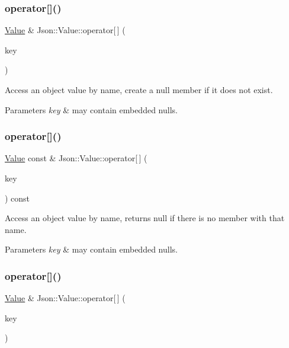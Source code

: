 \subsubsection{\texorpdfstring{operator[]()}{operator[]()}\hspace{0.1cm}{\footnotesize\ttfamily [7/9]}}
{\footnotesize\ttfamily \hyperlink{classJson_1_1Value}{Value} \& Json\+::\+Value\+::operator\mbox{[}$\,$\mbox{]} (\begin{DoxyParamCaption}\item[{const J\+S\+O\+N\+C\+P\+P\+\_\+\+S\+T\+R\+I\+NG \&}]{key }\end{DoxyParamCaption})}

Access an object value by name, create a null member if it does not exist. 
\begin{DoxyParams}{Parameters}
{\em key} & may contain embedded nulls. \\
\hline
\end{DoxyParams}
\mbox{\label{classJson_1_1Value_aba60f69dcd85e935aa85e7a517e03427}} 
\subsubsection{\texorpdfstring{operator[]()}{operator[]()}\hspace{0.1cm}{\footnotesize\ttfamily [8/9]}}
{\footnotesize\ttfamily \hyperlink{classJson_1_1Value}{Value} const  \& Json\+::\+Value\+::operator\mbox{[}$\,$\mbox{]} (\begin{DoxyParamCaption}\item[{const J\+S\+O\+N\+C\+P\+P\+\_\+\+S\+T\+R\+I\+NG \&}]{key }\end{DoxyParamCaption}) const}

Access an object value by name, returns null if there is no member with that name. 
\begin{DoxyParams}{Parameters}
{\em key} & may contain embedded nulls. \\
\hline
\end{DoxyParams}
\mbox{\label{classJson_1_1Value_ac3763d7d315ca65dc188e273722f7955}} 
\subsubsection{\texorpdfstring{operator[]()}{operator[]()}\hspace{0.1cm}{\footnotesize\ttfamily [9/9]}}
{\footnotesize\ttfamily \hyperlink{classJson_1_1Value}{Value} \& Json\+::\+Value\+::operator\mbox{[}$\,$\mbox{]} (\begin{DoxyParamCaption}\item[{const \hyperlink{classJson_1_1StaticString}{Static\+String} \&}]{key }\end{DoxyParamCaption})}



